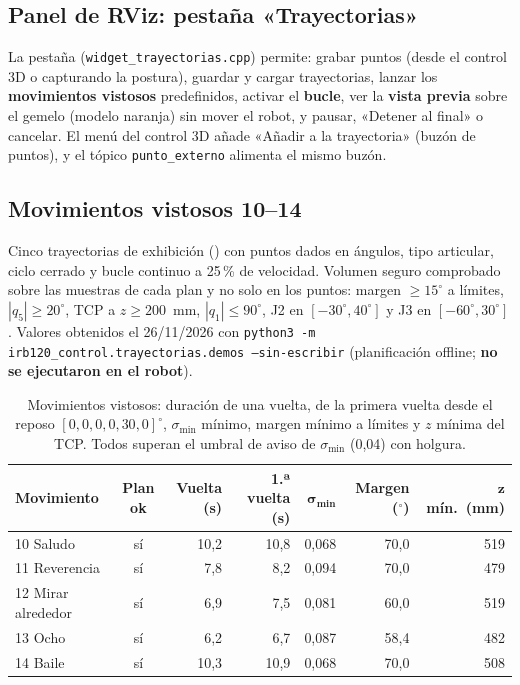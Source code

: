 \documentclass[10pt,a4paper]{article}
\DeclareRobustCommand{\ruta}[1]{\path{#1}}
\begin{document}
\subsection{Panel de RViz: pestaña «Trayectorias»}
La pestaña (\texttt{widget\_trayectorias.cpp}) permite: grabar puntos (desde el control 3D o capturando la postura), guardar y cargar trayectorias, lanzar los \textbf{movimientos vistosos} predefinidos, activar el \textbf{bucle}, ver la \textbf{vista previa} sobre el gemelo (modelo naranja) sin mover el robot, y pausar, «Detener al final» o cancelar. El menú del control 3D añade «Añadir a la trayectoria» (buzón de puntos), y el tópico \texttt{punto\_externo} alimenta el mismo buzón.

\subsection{Movimientos vistosos 10--14}
Cinco trayectorias de exhibición (\ruta{trayectorias/demos.py}) con puntos dados en ángulos, tipo articular, ciclo cerrado y bucle continuo a 25\,\% de velocidad. Volumen seguro comprobado sobre las muestras de cada plan y no solo en los puntos: margen $\ge15^\circ$ a límites, $|q_5|\ge20^\circ$, TCP a $z\ge200$~mm, $|q_1|\le90^\circ$, J2 en $[-30^\circ,40^\circ]$ y J3 en $[-60^\circ,30^\circ]$. Valores obtenidos el 26/11/2026 con \texttt{python3 -m irb120\_control.trayectorias.demos --sin-escribir} (planificación offline; \textbf{no se ejecutaron en el robot}).

\begin{table}[H]
\centering\small
\renewcommand{\arraystretch}{1.15}
\begin{tabular}{@{}lcrrrrr@{}}
\toprule
\textbf{Movimiento} & \textbf{Plan ok} & \textbf{Vuelta (s)} & \textbf{1.ª vuelta (s)} & $\bm{\sigma_{\min}}$ & \textbf{Margen ($^\circ$)} & $\bm{z}$ \textbf{mín.\ (mm)}\\
\midrule
10 Saludo & sí & 10,2 & 10,8 & 0,068 & 70,0 & 519\\
11 Reverencia & sí & 7,8 & 8,2 & 0,094 & 70,0 & 479\\
12 Mirar alrededor & sí & 6,9 & 7,5 & 0,081 & 60,0 & 519\\
13 Ocho & sí & 6,2 & 6,7 & 0,087 & 58,4 & 482\\
14 Baile & sí & 10,3 & 10,9 & 0,068 & 70,0 & 508\\
\bottomrule
\end{tabular}
\caption{Movimientos vistosos: duración de una vuelta, de la primera vuelta desde el reposo $[0,0,0,0,30,0]^\circ$, $\sigma_{\min}$ mínimo, margen mínimo a límites y $z$ mínima del TCP. Todos superan el umbral de aviso de $\sigma_{\min}$ (0,04) con holgura.}
\label{tab:vistosos}
\end{table}
\end{document}
